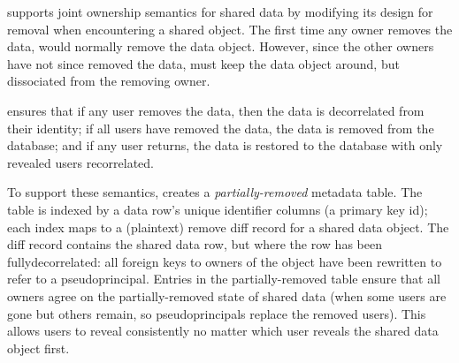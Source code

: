 \sys supports joint ownership semantics for shared data by modifying its design for
removal when encountering a shared object.
%
The first time any owner removes the data, \sys would normally remove the data
object. However, since the other owners have not since removed the data, \sys
must keep the data object around, but dissociated from the removing owner.
%

%
\sys ensures that \one{} if any user removes the data, then the data is
decorrelated from their identity; \two{} if all users have removed the data, the
data is removed from the database; and \three{} if any user returns, the data is
restored to the database with only revealed users recorrelated.  
%

%
To support these semantics, \sys creates a \emph{partially-removed} metadata
table. The table is indexed by a data row's unique identifier columns (\eg a
primary key id); each index maps to a (plaintext) remove diff record for a
shared data object. The diff record contains the shared data row, but where the
row has been fully\-decorrelated: all foreign keys to owners of the object have
been rewritten to refer to a pseudoprincipal.
%
Entries in the partially-removed table ensure that all owners agree on the
partially-removed state of shared data (\eg when some users are gone but others
remain, so pseudoprincipals replace the removed users). This allows users to
reveal consistently no matter which user reveals the shared data object first. 
%


